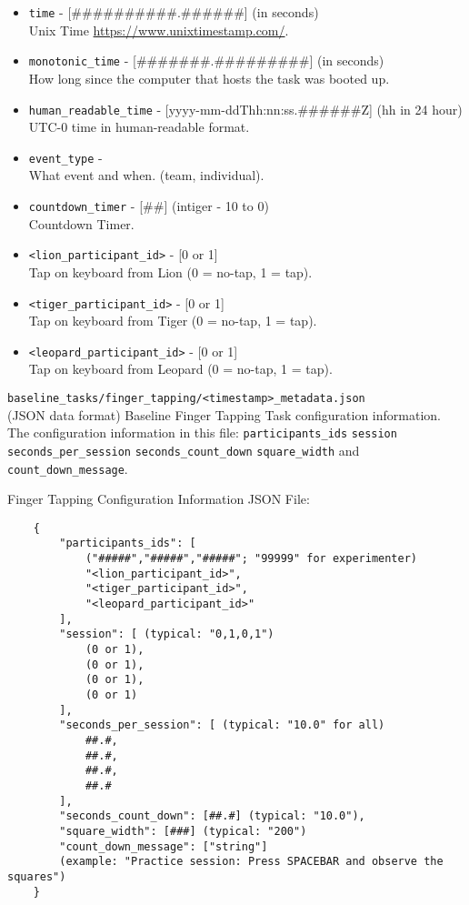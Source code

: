 \begin{description}
\begin{itemize}
    \item \verb|time| - [\#\#\#\#\#\#\#\#\#\#.\#\#\#\#\#\#] (in seconds)\\
		Unix Time \href{https://www.unixtimestamp.com/}{https://www.unixtimestamp.com/}.
    \item \verb|monotonic_time| - [\#\#\#\#\#\#\#.\#\#\#\#\#\#\#\#\#] (in seconds)\\
		How long since the computer that hosts the task was booted up.
    \item \verb|human_readable_time| - [yyyy-mm-ddThh:nn:ss.\#\#\#\#\#\#Z] (hh in 24 hour)\\
		 UTC-0 time in human-readable format.
    \item \verb|event_type| -\\
		What event and when. (team, individual).
    \item \verb|countdown_timer| - [\#\#] (intiger - 10 to 0)\\
		Countdown Timer.
    \item \verb|<lion_participant_id>| - [0 or 1]\\
		Tap on keyboard from Lion (0 = no-tap, 1 = tap).
    \item \verb|<tiger_participant_id>| - [0 or 1]\\
		Tap on keyboard from Tiger (0 = no-tap, 1 = tap).
    \item \verb|<leopard_participant_id>| - [0 or 1]\\
		Tap on keyboard from Leopard (0 = no-tap, 1 = tap).
\end{itemize}


\medskip
\item\verb|baseline_tasks/finger_tapping/<timestamp>_metadata.json|\\
    (JSON data format) Baseline Finger Tapping Task configuration information.
    The configuration information in this file: \verb|participants_ids|
    \verb|session| \verb|seconds_per_session| \verb|seconds_count_down|
    \verb|square_width| and \verb|count_down_message|.

\noindent Finger Tapping Configuration Information JSON File:

\begin{verbatim}
    {
        "participants_ids": [
            ("#####","#####","#####"; "99999" for experimenter)
            "<lion_participant_id>",
            "<tiger_participant_id>",
            "<leopard_participant_id>"
        ],
        "session": [ (typical: "0,1,0,1")
            (0 or 1),
            (0 or 1),
            (0 or 1),
            (0 or 1)
        ],
        "seconds_per_session": [ (typical: "10.0" for all)
            ##.#,
            ##.#,
            ##.#,
            ##.#
        ],
        "seconds_count_down": [##.#] (typical: "10.0"),
        "square_width": [###] (typical: "200")
        "count_down_message": ["string"]
        (example: "Practice session: Press SPACEBAR and observe the squares")
    }
\end{verbatim}




\end{description}
